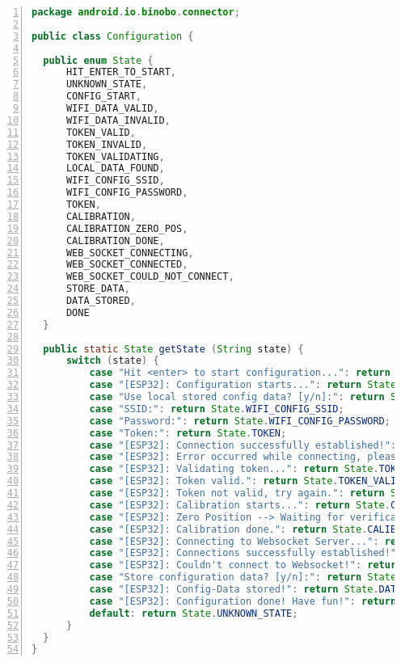 \documentclass[paper=a4,12pt]{scrreprt}
\begin{document}
\begin{lstlisting}[caption={State-Enumeration Objekt}, captionpos=b, label={listing:android_state}, language=java, morekeywords={enum}, numbers=left,
  stepnumber=1]
package android.io.binobo.connector;

public class Configuration {

  public enum State {
      HIT_ENTER_TO_START,
      UNKNOWN_STATE,
      CONFIG_START,
      WIFI_DATA_VALID,
      WIFI_DATA_INVALID,
      TOKEN_VALID,
      TOKEN_INVALID,
      TOKEN_VALIDATING,
      LOCAL_DATA_FOUND,
      WIFI_CONFIG_SSID,
      WIFI_CONFIG_PASSWORD,
      TOKEN,
      CALIBRATION,
      CALIBRATION_ZERO_POS,
      CALIBRATION_DONE,
      WEB_SOCKET_CONNECTING,
      WEB_SOCKET_CONNECTED,
      WEB_SOCKET_COULD_NOT_CONNECT,
      STORE_DATA,
      DATA_STORED,
      DONE
  }

  public static State getState (String state) {
      switch (state) {
          case "Hit <enter> to start configuration...": return State.HIT_ENTER_TO_START;
          case "[ESP32]: Configuration starts...": return State.CONFIG_START;
          case "Use local stored config data? [y/n]:": return State.LOCAL_DATA_FOUND;
          case "SSID:": return State.WIFI_CONFIG_SSID;
          case "Password:": return State.WIFI_CONFIG_PASSWORD;
          case "Token:": return State.TOKEN;
          case "[ESP32]: Connection successfully established!": return State.WIFI_DATA_VALID;
          case "[ESP32]: Error occurred while connecting, please try again.": return State.WIFI_DATA_INVALID;
          case "[ESP32]: Validating token...": return State.TOKEN_VALIDATING;
          case "[ESP32]: Token valid.": return State.TOKEN_VALID;
          case "[ESP32]: Token not valid, try again.": return State.TOKEN_INVALID;
          case "[ESP32]: Calibration starts...": return State.CALIBRATION;
          case "[ESP32]: Zero Position --> Waiting for verification...": return State.CALIBRATION_ZERO_POS;
          case "[ESP32]: Calibration done.": return State.CALIBRATION_DONE;
          case "[ESP32]: Connecting to Websocket Server...": return State.WEB_SOCKET_CONNECTING;
          case "[ESP32]: Connections successfully established!": return State.WEB_SOCKET_CONNECTED;
          case "[ESP32]: Couldn't connect to Websocket!": return State.WEB_SOCKET_COULD_NOT_CONNECT;
          case "Store configuration data? [y/n]:": return State.STORE_DATA;
          case "[ESP32]: Config-Data stored!": return State.DATA_STORED;
          case "[ESP32]: Configuration done! Have fun!": return State.DONE;
          default: return State.UNKNOWN_STATE;
      }
  }
}
\end{lstlisting}
\end{document}
